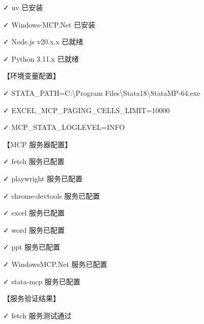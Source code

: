 \documentclass[
  american,
  chinese,
]{ctexart}
\begin{document}
\foreignlanguage{american}{✓}\foreignlanguage{american}{ {uv} }{已安装}\foreignlanguage{american}{}

\foreignlanguage{american}{✓}\foreignlanguage{american}{
Windows-MCP.Net }{已安装}\foreignlanguage{american}{}

\foreignlanguage{american}{✓}\foreignlanguage{american}{ Node.js
v20.x.x }{已就绪}\foreignlanguage{american}{}

\foreignlanguage{american}{✓}\foreignlanguage{american}{ Python
3.11.x }{已就绪}\foreignlanguage{american}{}

{【环境变量配置】}\foreignlanguage{american}{}

\foreignlanguage{american}{✓}\foreignlanguage{american}{
STATA\_PATH=C:\textbackslash Program Files\textbackslash Stata18\textbackslash StataMP-64.exe}

\foreignlanguage{american}{✓}\foreignlanguage{american}{
EXCEL\_MCP\_PAGING\_CELLS\_LIMIT=10000}

\foreignlanguage{american}{✓}\foreignlanguage{american}{
MCP\_STATA\_LOGLEVEL=INFO}

{【}\foreignlanguage{american}{MCP }{服务器配置】}\foreignlanguage{american}{}

\foreignlanguage{american}{✓}\foreignlanguage{american}{ fetch }{服务已配置}\foreignlanguage{american}{}

\foreignlanguage{american}{✓}\foreignlanguage{american}{ playwright }{服务已配置}\foreignlanguage{american}{}

\foreignlanguage{american}{✓}\foreignlanguage{american}{ chrome-{devtools} }{服务已配置}\foreignlanguage{american}{}

\foreignlanguage{american}{✓}\foreignlanguage{american}{ excel }{服务已配置}\foreignlanguage{american}{}

\foreignlanguage{american}{✓}\foreignlanguage{american}{ word }{服务已配置}\foreignlanguage{american}{}

\foreignlanguage{american}{✓}\foreignlanguage{american}{ ppt }{服务已配置}\foreignlanguage{american}{}

\foreignlanguage{american}{✓}\foreignlanguage{american}{
WindowsMCP.Net }{服务已配置}\foreignlanguage{american}{}

\foreignlanguage{american}{✓}\foreignlanguage{american}{ {stata-mcp} }{服务已配置}\foreignlanguage{american}{}

{【服务验证结果】}\foreignlanguage{american}{}

\foreignlanguage{american}{✓}\foreignlanguage{american}{ fetch }{服务测试通过}\foreignlanguage{american}{}
\end{document}
